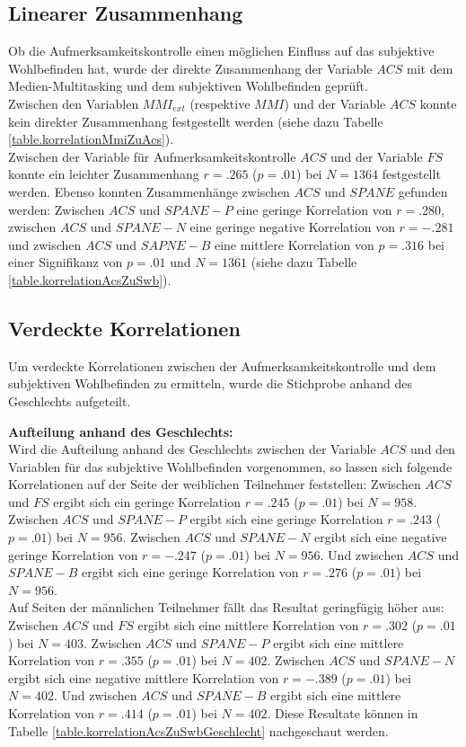 \subsection{Linearer Zusammenhang}
Ob die Aufmerksamkeitskontrolle einen möglichen Einfluss auf das subjektive Wohlbefinden hat, wurde der direkte Zusammenhang der Variable $ACS$ mit dem Medien-Multitasking und dem subjektiven Wohlbefinden geprüft. \\
Zwischen den Variablen $MMI_{ext}$ (respektive $MMI$) und der Variable $ACS$ konnte kein direkter Zusammenhang festgestellt werden (siehe dazu Tabelle \ref{table.korrelationMmiZuAcs}).\\
Zwischen der Variable für Aufmerksamkeitskontrolle $ACS$ und der Variable $FS$ konnte ein leichter Zusammenhang $r=.265$ ($p=.01$) bei $N=1364$ festgestellt werden. Ebenso konnten Zusammenhänge zwischen $ACS$ und $SPANE$ gefunden werden: Zwischen $ACS$ und $SPANE-P$ eine geringe Korrelation von $r=.280$, zwischen $ACS$ und $SPANE-N$ eine geringe negative Korrelation von $r=-.281$ und zwischen $ACS$ und $SAPNE-B$ eine mittlere Korrelation von $p=.316$ bei einer Signifikanz von $p=.01$ und $N=1361$ (siehe dazu Tabelle \ref{table.korrelationAcsZuSwb}).
\subsection{Verdeckte Korrelationen}
Um verdeckte Korrelationen zwischen der Aufmerksamkeitskontrolle und dem subjektiven Wohlbefinden zu ermitteln, wurde die Stichprobe anhand des Geschlechts aufgeteilt.\par
\textbf{Aufteilung anhand des Geschlechts:}\\
Wird die Aufteilung anhand des Geschlechts zwischen der Variable $ACS$ und den Variablen für das subjektive Wohlbefinden vorgenommen, so lassen sich folgende Korrelationen auf der Seite der weiblichen Teilnehmer feststellen: Zwischen $ACS$ und $FS$ ergibt sich ein geringe Korrelation $r=.245$ ($p=.01$) bei $N=958$. Zwischen $ACS$ und $SPANE-P$ ergibt sich eine geringe Korrelation $r=.243$ ($p=.01$) bei $N=956$. Zwischen $ACS$ und $SPANE-N$ ergibt sich eine negative geringe Korrelation von $r=-.247$ ($p=.01$) bei $N=956$. Und zwischen $ACS$ und $SPANE-B$ ergibt sich eine geringe Korrelation von $r=.276$ ($p=.01$) bei $N=956$.\\
Auf Seiten der männlichen Teilnehmer fällt das Resultat geringfügig höher aus: Zwischen $ACS$ und $FS$ ergibt sich eine mittlere Korrelation von $r=.302$ ($p=.01$) bei $N=403$. Zwischen $ACS$ und $SPANE-P$ ergibt sich eine mittlere Korrelation von $r=.355$ ($p=.01$) bei $N=402$. Zwischen $ACS$ und $SPANE-N$ ergibt sich eine negative mittlere Korrelation von $r=-.389$ ($p=.01$) bei $N=402$. Und zwischen $ACS$ und $SPANE-B$ ergibt sich eine mittlere Korrelation von $r=.414$ ($p=.01$) bei $N=402$. Diese Resultate können in Tabelle \ref{table.korrelationAcsZuSwbGeschlecht} nachgeschaut werden.
